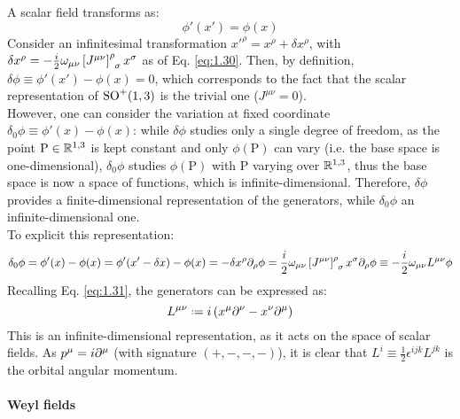 A scalar field transforms as:
\begin{equation}
  \phi'(x') = \phi(x)
  \label{eq:1.44}
\end{equation}
Consider an infinitesimal transformation $ x'^\rho = x^\rho + \delta x^\rho $, with $ \delta x^\rho = - \frac{i}{2} \omega_{\mu \nu} \tensor{\left[ J^{\mu \nu} \right]}{^\rho_\sigma} x^\sigma $ as of Eq. \ref{eq:1.30}. Then, by definition, $ \delta \phi \equiv \phi'(x') - \phi(x) = 0 $, which corresponds to the fact that the scalar representation of $ \mathrm{SO}^+(1,3) $ is the trivial one ($ J^{\mu \nu} = 0 $).\\
However, one can consider the variation at fixed coordinate $ \delta_0 \phi \equiv \phi'(x) - \phi(x) $: while $ \delta \phi $ studies only a single degree of freedom, as the point $ \text{P} \in \mathbb{R}^{1,3} $ is kept constant and only $ \phi(\text{P}) $ can vary (i.e. the base space is one-dimensional), $ \delta_0 \phi $ studies $ \phi(\text{P}) $ with $ \text{P} $ varying over $ \mathbb{R}^{1,3} $, thus the base space is now a space of functions, which is infinite-dimensional. Therefore, $ \delta \phi $ provides a finite-dimensional representation of the generators, while $ \delta_0 \phi $ an infinite-dimensional one.\\
To explicit this representation:
\begin{equation*}
  \delta_0 \phi = \phi'(x) - \phi(x) = \phi'(x' - \delta x) - \phi(x) = - \delta x^\rho \pa_\rho \phi = \frac{i}{2} \omega_{\mu \nu} \tensor{\left[ J^{\mu \nu} \right]}{^\rho_\sigma} x^\sigma \pa_\rho \phi \equiv - \frac{i}{2} \omega_{\mu \nu} L^{\mu \nu} \phi
\end{equation*}
Recalling Eq. \ref{eq:1.31}, the generators can be expressed as:
\begin{equation}
  L^{\mu \nu} \defeq i \left( x^\mu \pa^\nu - x^\nu \pa^\mu \right)
  \label{eq:1.45}
\end{equation}
This is an infinite-dimensional representation, as it acts on the space of scalar fields. As $ p^\mu = i \partial^\mu $ (with signature $ (+,-,-,-) $), it is clear that $ L^i \equiv \frac{1}{2} \epsilon^{ijk} L^{jk} $ is the orbital angular momentum.

\paragraph{Weyl fields}

